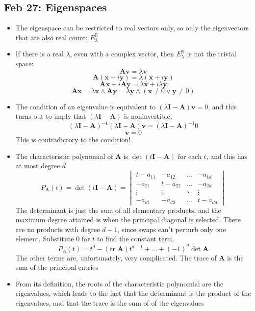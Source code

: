 \documentclass[10pt, oneside]{article}
\newcommand{\R}{\mathbb{R}}
\renewcommand{\vec}[1]{\mathbf{#1}}
\newcommand{\mat}[1]{\mathbf{#1}}
\begin{document}
\subsection{Feb 27: Eigenspaces}
\begin{itemize}
    \item The eigenspace can be restricted to real vectors only, so only the eigenvectors that are also real count: $E^\R_\lambda$
    \item If there is a real $\lambda$, even with a complex vector, then $E^\R_\lambda$ is not the trivial space:
        \[\mat{A}\vec{v} = \lambda\vec{v}\]
        \[\mat{A}(\vec{x} + i\vec{y}) = \lambda(\vec{x} + i\vec{y})\]
        \[\mat{A}\vec{x} + i\mat{A}\vec{y} = \lambda\vec{x} + i\lambda\vec{y}\]
        \[\mat{A}\vec{x} = \lambda\vec{x} \land \mat{A}\vec{y} = \lambda\vec{y} \land (\vec{x} \neq 0 \lor \vec{y} \neq 0)\]
    \item The condition of an eigenvalue is equivalent to $(\lambda \mat{I} - \mat{A})\vec{v} = 0$, and this turns out to imply that $(\lambda \mat{I} - \mat{A})$ is noninvertible,
        \[(\lambda \mat{I} - \mat{A})^{-1} (\lambda \mat{I} - \mat{A}) \vec{v} = (\lambda \mat{I} - \mat{A})^{-1} 0\]
        \[\vec{v} = 0\]
        This is contradictory to the condition!
    \item The characteristic polynomial of $\mat{A}$ is $\det (t \mat{I} - \mat{A})$ for each $t$, and this has at most degree $d$
        \[P_\mat{A}(t) = \det (t \mat{I} - \mat{A}) =
        \begin{vmatrix}
        t - a_{11} & - a_{12} & \hdots & - a_{1d}\\
        - a_{21} & t - a_{22} & \hdots & - a_{2d}\\
        \vdots & \vdots & \ddots & \vdots\\
        - a_{d1} & - a_{d2} & \hdots & t - a_{dd}
        \end{vmatrix}\]
        The determinant is just the sum of all elementary products, and the maximum degree attained is when the principal diagonal is selected. There are no products with degree $d-1$, since swaps can't perturb only one element. Substitute $0$ for $t$ to find the constant term.
        \[P_A(t) = t^d - (\text{tr } \mat{A})t^{d-1} + \hdots + (-1)^d \det \mat{A}\]
        The other terms are, unfortunately, very complicated. The trace of $\mat{A}$ is the sum of the principal entries
    \item From its definition, the roots of the characteristic polynomial are the eigenvalues, which leads to the fact that the determinant is the product of the eigenvalues, and that the trace is the sum of of the eigenvalues
\end{itemize}
\end{document}
